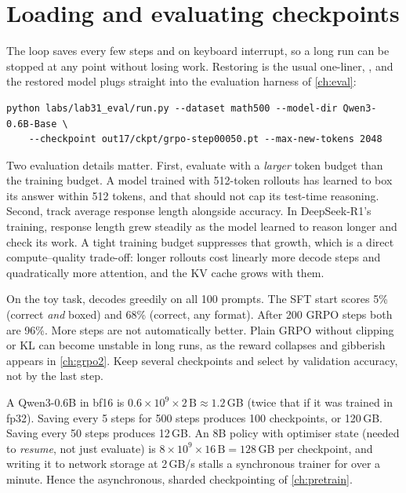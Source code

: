\section{Loading and evaluating checkpoints}\label{sec:grpo:ckpt}

The loop saves  every few steps and on keyboard interrupt, so a
long run can be stopped at any point without losing work. Restoring is the usual one-liner,
, and the restored model plugs straight into
the evaluation harness of \cref{ch:eval}:

\begin{lstlisting}[style=shell,caption={Evaluating an RL checkpoint on MATH-500 with the Chapter 31 harness.},label={lst:grpo:eval}]
python labs/lab31_eval/run.py --dataset math500 --model-dir Qwen3-0.6B-Base \
    --checkpoint out17/ckpt/grpo-step00050.pt --max-new-tokens 2048
\end{lstlisting}

Two evaluation details matter. First, evaluate with a \emph{larger} token budget than the
training budget. A model trained with 512-token rollouts has learned to box its answer
within 512 tokens, and that should not cap its test-time reasoning. Second, track
average response length alongside accuracy. In DeepSeek-R1's training, response length
grew steadily as the model learned to reason longer and check its work. A tight training
budget suppresses that growth, which is a direct compute--quality trade-off: longer
rollouts cost linearly more decode steps and quadratically more attention, and the KV cache
grows with them.

On the toy task,  decodes greedily on all 100 prompts. The SFT
start scores 5\% (correct \emph{and} boxed) and 68\% (correct, any format). After 200 GRPO
steps both are 96\%. More steps are not automatically better. Plain GRPO without clipping
or KL can become unstable in long runs, as the reward collapses and gibberish appears in
\cref{ch:grpo2}. Keep several checkpoints and select by validation accuracy, not by the
last step.

\begin{napkinmath}
A Qwen3-0.6B  in bf16 is $0.6\times10^9\times2\,\text{B}\approx1.2$\,GB
(twice that if it was trained in fp32). Saving every 5 steps for
500 steps produces 100 checkpoints, or 120\,GB. Saving every 50 steps produces 12\,GB. An 8B
policy with optimiser state (needed to \emph{resume}, not just evaluate) is
$8\times10^9\times16\,\text{B}=128$\,GB per checkpoint, and writing it to network storage at
2\,GB/s stalls a synchronous trainer for over a minute. Hence the asynchronous, sharded
checkpointing of \cref{ch:pretrain}.
\end{napkinmath}

